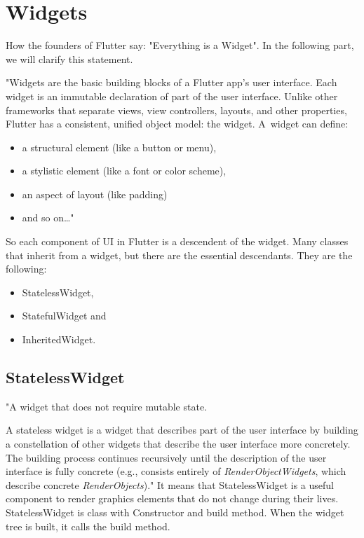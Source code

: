 \section{Widgets}\label{sec:widgets}
How the founders of Flutter say: "Everything is a Widget".
In the following part, we will clarify this statement.

"Widgets are the basic building blocks of a Flutter app's user interface.
Each widget is an immutable declaration of part of the user interface.
Unlike other frameworks that separate views, view controllers, layouts, and other properties, Flutter has a consistent, unified object model: the widget.
A~widget can define:
\begin{itemize}
    \item a structural element (like a button or menu),
    \item a stylistic element (like a font or color scheme),
    \item an aspect of layout (like padding)
    \item and so on\ldots"\cite{flutterTechnicalOverview}
\end{itemize}

So each component of UI in Flutter is a descendent of the widget.
Many classes that inherit from a widget, but there are the essential descendants.
They are the following:
\begin{itemize}
    \item StatelessWidget,
    \item StatefulWidget and
    \item InheritedWidget.
\end{itemize}


\subsection{StatelessWidget}\label{subsec:statelesswidget}
"A widget that does not require mutable state.

A stateless widget is a widget that describes part of the user interface by building a constellation of other widgets that describe the user interface more concretely.
The building process continues recursively until the description of the user interface is fully concrete (e.g., consists entirely of
\textit{RenderObjectWidgets}\cite{renderObjectWidget}, which describe concrete \textit{RenderObjects}\cite{renderObject})."\cite{statelessWidget}
It means that StatelessWidget is a useful component to render graphics elements that do not change during their lives.
StatelessWidget is class with Constructor and build method.
When the widget tree is built, it calls the build method.

